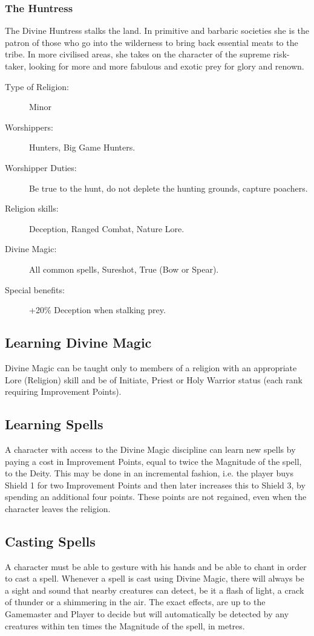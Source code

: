 \subsubsection{The Huntress}
The Divine Huntress stalks the land. In primitive and barbaric societies she is the patron of those who go into the wilderness to bring back essential meats to the tribe. In more civilised areas, she takes on the character of the supreme risk-taker, looking for more and more fabulous and exotic prey for glory and renown.

\begin{description}
\item[Type of Religion:] Minor
\item[Worshippers:] Hunters, Big Game Hunters.
\item[Worshipper Duties:] Be true to the hunt, do not deplete the hunting grounds, capture poachers.
\item[Religion skills:] Deception, Ranged Combat, Nature Lore.
\item[Divine Magic:] All common spells, Sureshot, True (Bow or Spear).
\item[Special benefits:] +20\% Deception when stalking prey.
\end{description}



\subsection{Learning Divine Magic}
Divine Magic can be taught only to members of a religion with an appropriate Lore (Religion) skill and be of Initiate, Priest or Holy Warrior status (each rank requiring Improvement Points).


\subsection{Learning Spells}
A character with access to the Divine Magic discipline can learn new spells by paying a cost in Improvement Points, equal to twice the Magnitude of the spell, to the Deity. This may be done in an incremental fashion, i.e. the player buys Shield 1 for two Improvement Points and then later increases this to Shield 3, by spending an additional four points. These points are not regained, even when the character leaves the religion.


\subsection{Casting Spells}
A character must be able to gesture with his hands and be able to chant in order to cast a spell. Whenever a spell is cast using Divine Magic, there will always be a sight and sound that nearby creatures can detect, be it a flash of light, a crack of thunder or a shimmering in the air. The exact effects, are up to the Gamemaster and Player to decide but will automatically be detected by any creatures within ten times the Magnitude of the spell, in metres. 

